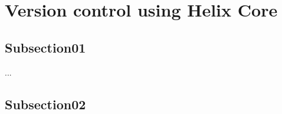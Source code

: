 \section{Version control using Helix Core\textsuperscript{\texttrademark}}
    \subsection{Subsection01}
    ...

    \subsection{Subsection02}
